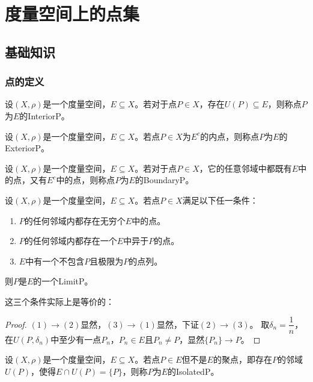\section{度量空间上的点集}
\subsection{基础知识}
\subsubsection{点的定义}
\begin{definition}
	设$(X,\rho)$是一个度量空间，$E\subseteq X$。若对于点$P\in X$，存在$U(P)\subseteq E$，则称点$P$为$E$的\gls{InteriorP}。
\end{definition}
\begin{definition}
	设$(X,\rho)$是一个度量空间，$E\subseteq X$。若点$P\in X$为$E^c$的内点，则称点$P$为$E$的\gls{ExteriorP}。
\end{definition}
\begin{definition}
	设$(X,\rho)$是一个度量空间，$E\subseteq X$。若对于点$P\in X$，它的任意邻域中都既有$E$中的点，又有$E^c$中的点，则称点$P$为$E$的\gls{BoundaryP}。
\end{definition}
\begin{definition}
	设$(X,\rho)$是一个度量空间，$E\subseteq X$。若点$P\in X$满足以下任一条件：
	\begin{enumerate}
		\item $P$的任何邻域内都存在无穷个$E$中的点。
		\item $P$的任何邻域内都存在一个$E$中异于$P$的点。
		\item $E$中有一个不包含$P$且极限为$P$的点列。
	\end{enumerate}
	则$P$是$E$的一个\gls{LimitP}。
\end{definition}
这三个条件实际上是等价的：
\begin{proof}
	$(1)\to(2)$显然，$(3)\to(1)$显然，下证$(2)\to(3)$。
	取$\delta_n=\dfrac{1}{n}$，在$U(P,\delta_n)$中至少有一点$P_n$，$P_n\in E$且$P_n\ne P$，显然$\{P_n\}\to P$。
\end{proof}
\begin{definition}
	设$(X,\rho)$是一个度量空间，$E\subseteq X$。若点$P\in E$但不是$E$的聚点，即存在$P$的邻域$U(P)$，使得$E\cap U(P)=\{P\}$，则称$P$为$E$的\gls{IsolatedP}。
\end{definition}
